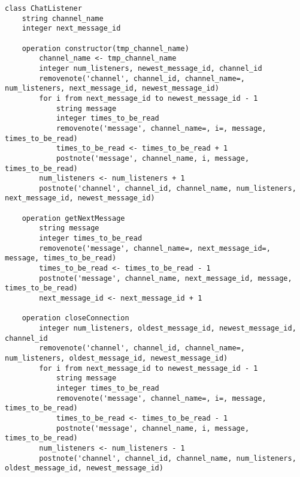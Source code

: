 \documentclass[10pt,a4paper]{article}
\begin{document}
\begin{verbatim}
class ChatListener
	string channel_name
	integer next_message_id
	
	operation constructor(tmp_channel_name)
		channel_name <- tmp_channel_name
		integer num_listeners, newest_message_id, channel_id
		removenote('channel', channel_id, channel_name=, num_listeners, next_message_id, newest_message_id)
		for i from next_message_id to newest_message_id - 1
			string message
			integer times_to_be_read
			removenote('message', channel_name=, i=, message, times_to_be_read)
			times_to_be_read <- times_to_be_read + 1
			postnote('message', channel_name, i, message, times_to_be_read)
		num_listeners <- num_listeners + 1
		postnote('channel', channel_id, channel_name, num_listeners, next_message_id, newest_message_id)

	operation getNextMessage
		string message
		integer times_to_be_read
		removenote('message', channel_name=, next_message_id=, message, times_to_be_read)
		times_to_be_read <- times_to_be_read - 1
		postnote('message', channel_name, next_message_id, message, times_to_be_read)
		next_message_id <- next_message_id + 1

	operation closeConnection
		integer num_listeners, oldest_message_id, newest_message_id, channel_id
		removenote('channel', channel_id, channel_name=, num_listeners, oldest_message_id, newest_message_id)
		for i from next_message_id to newest_message_id - 1
			string message
			integer times_to_be_read
			removenote('message', channel_name=, i=, message, times_to_be_read)
			times_to_be_read <- times_to_be_read - 1
			postnote('message', channel_name, i, message, times_to_be_read)
		num_listeners <- num_listeners - 1
		postnote('channel', channel_id, channel_name, num_listeners, oldest_message_id, newest_message_id)
\end{verbatim}
\end{document}
